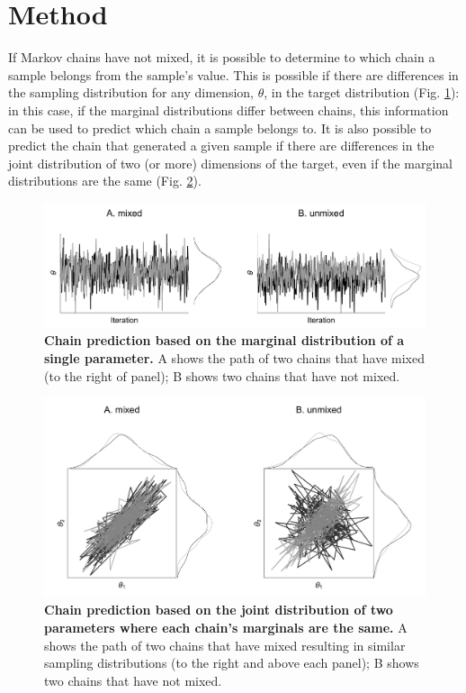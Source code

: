 \documentclass{article}
\begin{document}
\section{Method}\label{sec:method}
If Markov chains have not mixed, it is possible to determine to which chain a sample belongs from the sample's value. This is possible if there are differences in the sampling distribution for any dimension, $\theta$, in the target distribution (Fig. \ref{fig:marginal}): in this case, if the marginal distributions differ between chains, this information can be used to predict which chain a sample belongs to. It  is also possible to predict the chain that generated a given sample if there are differences in the joint distribution of two (or more) dimensions of the target, even if the marginal distributions are the same (Fig. \ref{fig:joint}).

\begin{figure}[h]
	\centerline{\includegraphics[width=1.0\textwidth]{../output/unmixed_1.pdf}}
	\caption{\textbf{Chain prediction based on the marginal distribution of a single parameter.} A shows the path of two chains that have mixed (to the right of panel); B shows two chains that have not mixed.}
	\label{fig:marginal}
\end{figure}

\begin{figure}[h]
	\centerline{\includegraphics[width=1.0\textwidth]{../output/unmixed_2.pdf}}
	\caption{\textbf{Chain prediction based on the joint distribution of two parameters where each chain's marginals are the same.} A shows the path of two chains that have mixed resulting in similar sampling distributions (to the right and above each panel); B shows two chains that have not mixed.}
	\label{fig:joint}
\end{figure}
\end{document}
